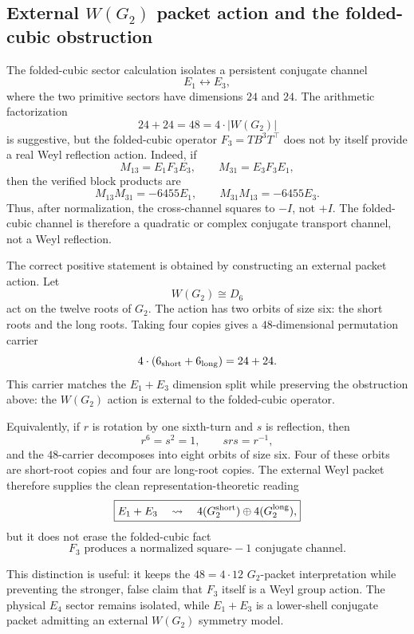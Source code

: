 \subsection{External \texorpdfstring{$W(G_2)$}{W(G2)} packet action and the folded-cubic obstruction}
\label{subsec:bt627-external-wg2-packet}

The folded-cubic sector calculation isolates a persistent conjugate channel
\[
E_1\leftrightarrow E_3,
\]
where the two primitive sectors have dimensions \(24\) and \(24\).  The arithmetic factorization
\[
24+24=48=4\cdot |W(G_2)|
\]
is suggestive, but the folded-cubic operator \(F_3=TB^3T^\top\) does not by itself provide a real Weyl reflection action.  Indeed, if
\[
M_{13}=E_1F_3E_3,\qquad M_{31}=E_3F_3E_1,
\]
then the verified block products are
\[
M_{13}M_{31}=-6455E_1,\qquad M_{31}M_{13}=-6455E_3.
\]
Thus, after normalization, the cross-channel squares to \(-I\), not \(+I\).  The folded-cubic channel is therefore a quadratic or complex conjugate transport channel, not a Weyl reflection.

The correct positive statement is obtained by constructing an external packet action.  Let
\[
W(G_2)\cong D_6
\]
act on the twelve roots of \(G_2\).  The action has two orbits of size six: the short roots and the long roots.  Taking four copies gives a \(48\)-dimensional permutation carrier
\[
4\cdot(6_{\rm short}+6_{\rm long})=24+24.
\]
This carrier matches the \(E_1+E_3\) dimension split while preserving the obstruction above: the \(W(G_2)\) action is external to the folded-cubic operator.

Equivalently, if \(r\) is rotation by one sixth-turn and \(s\) is reflection, then
\[
r^6=s^2=1,\qquad srs=r^{-1},
\]
and the \(48\)-carrier decomposes into eight orbits of size six.  Four of these orbits are short-root copies and four are long-root copies.  The external Weyl packet therefore supplies the clean representation-theoretic reading
\[
\boxed{E_1+E_3\quad\leadsto\quad 4(G_2^{\rm short})\oplus4(G_2^{\rm long}),}
\]
but it does not erase the folded-cubic fact
\[
\boxed{F_3\text{ produces a normalized square-}\!-1\text{ conjugate channel.}}
\]

This distinction is useful: it keeps the \(48=4\cdot12\) \(G_2\)-packet interpretation while preventing the stronger, false claim that \(F_3\) itself is a Weyl group action.  The physical \(E_4\) sector remains isolated, while \(E_1+E_3\) is a lower-shell conjugate packet admitting an external \(W(G_2)\) symmetry model.
